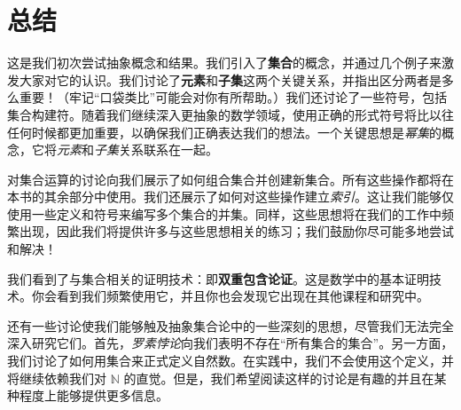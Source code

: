 \section{总结}

这是我们初次尝试抽象概念和结果。我们引入了\textbf{集合}的概念，并通过几个例子来激发大家对它的认识。我们讨论了\textbf{元素}和\textbf{子集}这两个关键关系，并指出区分两者是多么重要！（牢记``口袋类比''可能会对你有所帮助。）我们还讨论了一些符号，包括集合构建符。随着我们继续深入更抽象的数学领域，使用正确的形式符号将比以往任何时候都更加重要，以确保我们正确表达我们的想法。一个关键思想是\emph{幂集}的概念，它将\emph{元素}和\emph{子集}关系联系在一起。

对集合运算的讨论向我们展示了如何组合集合并创建新集合。所有这些操作都将在本书的其余部分中使用。我们还展示了如何对这些操作建立\emph{索引}。这让我们能够仅使用一些定义和符号来编写多个集合的并集。同样，这些思想将在我们的工作中频繁出现，因此我们将提供许多与这些思想相关的练习；我们鼓励你尽可能多地尝试和解决！

我们看到了与集合相关的证明技术：即\textbf{双重包含论证}。这是数学中的基本证明技术。你会看到我们频繁使用它，并且你也会发现它出现在其他课程和研究中。

还有一些讨论使我们能够触及抽象集合论中的一些深刻的思想，尽管我们无法完全深入研究它们。首先，\emph{罗素悖论}向我们表明不存在``所有集合的集合''。另一方面，我们讨论了如何用集合来正式定义自然数。在实践中，我们不会使用这个定义，并将继续依赖我们对 $\mathbb{N}$ 的直觉。但是，我们希望阅读这样的讨论是有趣的并且在某种程度上能够提供更多信息。